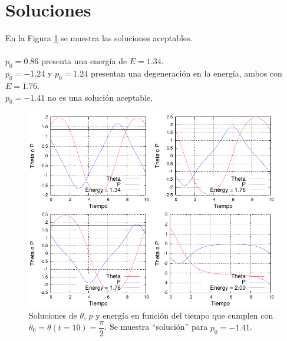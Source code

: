 \documentclass[10pt,letterpaper]{article}
\begin{document}
\section{Soluciones}
En la Figura \ref{Fig-Sol} se muestra las soluciones aceptables. \\ \\
$p_0 = 0.86$ presenta una energía de $E = 1.34$. \\
$p_0 = -1.24$ y $p_0 = 1.24$ presentan una degeneración en la energía, ambos con $E = 1.76$. \\
$p_0 = -1.41$ no es una solución aceptable.
\begin{figure}
\centering
\includegraphics[scale=1.5]{Grafica.pdf}
\caption{Soluciones de $\theta$, $p$ y energía en función del tiempo que cumplen con $\theta_0 = \theta(t=10) = \dfrac{\pi}{2}$. Se muestra ``solución'' para $p_0 = -1.41$.}\label{Fig-Sol}
\end{figure}
\end{document}
